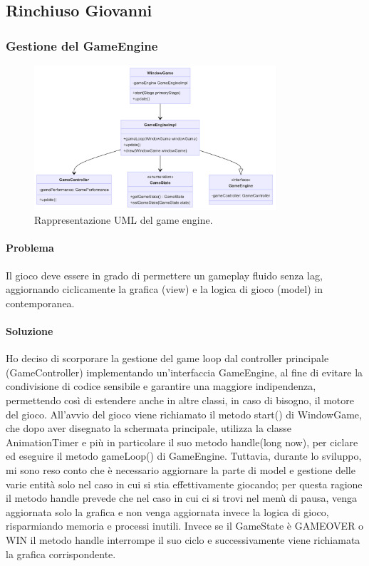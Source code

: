 \documentclass[a4paper,12pt]{report}
\begin{document}
\subsection{Rinchiuso Giovanni}

\subsubsection{Gestione del GameEngine}

\begin{figure}[H]
\centering{}
\includegraphics[width=0.8\textwidth]{img/GameEngine.png}
\caption{Rappresentazione UML del game engine.}
\end{figure}

\paragraph{Problema} Il gioco deve essere in grado di permettere un gameplay fluido senza lag, aggiornando ciclicamente la grafica (view) e la logica di gioco (model) in contemporanea.

\paragraph{Soluzione} Ho deciso di scorporare la gestione del game loop dal controller principale (GameController) implementando un’interfaccia GameEngine, al fine di evitare la condivisione di codice sensibile e garantire una maggiore indipendenza, permettendo così di estendere anche in altre classi, in caso di bisogno, il motore del gioco. All'avvio del gioco viene richiamato il metodo start() di WindowGame, che dopo aver disegnato la schermata principale, utilizza la classe AnimationTimer e più in particolare il suo metodo handle(long now), per ciclare ed eseguire il metodo gameLoop() di GameEngine. Tuttavia, durante lo sviluppo, mi sono reso conto che è necessario aggiornare la parte di model e gestione delle varie entità solo nel caso in cui si stia effettivamente giocando; per questa ragione il metodo handle prevede che nel caso in cui ci si trovi nel menù di pausa, venga aggiornata solo la grafica e non venga aggiornata invece la logica di gioco, risparmiando memoria e processi inutili. Invece se il GameState è GAMEOVER o WIN il metodo handle interrompe il suo ciclo e successivamente viene richiamata la grafica corrispondente. 
\end{document}
